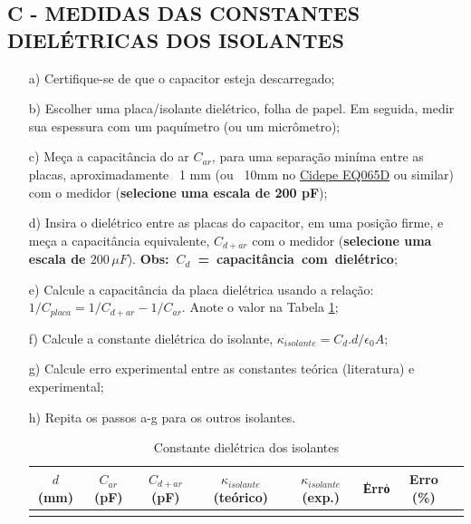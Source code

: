 	\subsection{C - MEDIDAS DAS CONSTANTES DIELÉTRICAS DOS ISOLANTES}
	
	\begin{itemize}
		\item[a)] Certifique-se de que o capacitor esteja descarregado;
		\item[b)] Escolher uma placa/isolante dielétrico, folha de papel. Em seguida, medir sua espessura com um paquímetro (ou um micrômetro);
		\item[c)] Meça a capacitância do ar $C_{ar}$, para uma separação miníma entre as placas, aproximadamente ~1 mm (ou ~10mm no \href{https://www.cidepe.com.br/index.php/br/produtos-interna/capacitor-variavel-de-placas-paralelas-e-cabos-0-a-255-pf-1875}{Cidepe EQ065D} ou similar) com o medidor ({\color{red}\textbf{selecione uma escala de 200 pF}});
		\item[d)] Insira o dielétrico entre as placas do capacitor, em uma posição firme, e meça a capacitância equivalente, ${C}_{d+ar}$ com o medidor ({\color{red}\textbf{selecione uma escala de $200 \,\mu F$}}). \hbox{\textbf{Obs: $C_{d}$ = capacitância com dielétrico}};
		
		\item[e)] Calcule a capacitância da placa dielétrica usando a relação: $ 1/C_{placa}=1/C_{d+ar}-1/C_{ar}$. Anote o valor na Tabela \ref{tab:cte-dieletrica-isolantes};
		\item[f)] Calcule a constante dielétrica do isolante, $ \kappa_{isolante}=C_{d}.d{/\epsilon_{0}A}$;
		\item[g)] Calcule erro experimental entre as constantes teórica (literatura) e experimental;
			\item[h)] Repita os passos a-g para os outros isolantes.
		
		\begin{table}[H]
		\centering
		\begin{tabular}{|c|c|c|c|c|c|c|c|}
			\hline 
			$d$ (mm) & $C_{ar}$ (pF) & $C_{d+ar}$ (pF) & $\kappa_{isolante}$ (teórico) &  $\kappa_{isolante}$ (exp.) & \|Erro\|  & Erro (\%) \\ 
			\hline 
			&  &  &  &  &  &\\ 
			\hline 
		\end{tabular} 
			\caption{Constante dielétrica dos isolantes}
			\label{tab:cte-dieletrica-isolantes}
		\end{table}
	\end{itemize}

